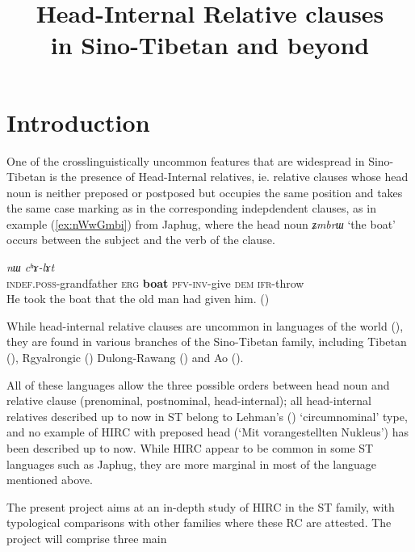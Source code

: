 \documentclass[oneside,a4paper,11pt]{article}
\newcommand{\ipa}[1]{\mbox{\phon\textit{#1}}} %
\begin{document}
 
\title{Head-Internal Relative clauses\\in Sino-Tibetan and beyond}
\maketitle

\section*{Introduction}
One of the crosslinguistically uncommon features that are widespread in Sino-Tibetan is the presence of Head-Internal relatives, ie. relative clauses whose head noun is neither preposed or postposed but occupies the same position and takes the same case marking as in the corresponding indepdendent clauses, as in example (\ref{ex:nWwGmbi}) from Japhug, where the head noun \ipa{ʑmbrɯ} `the boat' occurs between the subject and the verb of the clause.

\begin{exe}
\ex \label{ex:nWwGmbi}
\gll
[\ipa{tɤ-wɯ} 	\ipa{kɯ} 	\textbf{\ipa{ʑmbrɯ}} 	\ipa{nɯ́-wɣ-mbi}] 	\ipa{nɯ} 	 	\ipa{cʰɤ-lɤt} \\
\textsc{indef.poss}-grandfather \textsc{erg} \textbf{boat} \textsc{pfv-inv}-give \textsc{dem} \textsc{ifr}-throw \\
\glt He took the boat that the old man had given him. (\citealt{jacques16relatives})
\end{exe}

While head-internal relative clauses are uncommon in languages of the world (\citealt{dryer13relative}), they are found in various branches of the Sino-Tibetan family, including Tibetan (\citealt{mazaudon78relatives}), Rgyalrongic (\citealt{jackson06guanxiju, jacques16relatives}) Dulong-Rawang (\citealt{lapolla08relative}) and Ao (\citealt{coupe07mongsen}).

All of these languages allow the three possible orders between head noun and relative clause (prenominal, postnominal, head-internal); all head-internal relatives described up to now in ST belong to Lehman's (\citeyear[109]{lehmann84relativsatz}) `circumnominal' type, and no example of HIRC with preposed head (`Mit vorangestellten Nukleus') has been described up to now. While HIRC appear to be common in some ST languages such as Japhug, they are more marginal in most of the language mentioned above. 

The present project aims at an in-depth study of HIRC in the ST family, with typological comparisons with other families where these RC are attested. The project will comprise three main 
\end{document}

